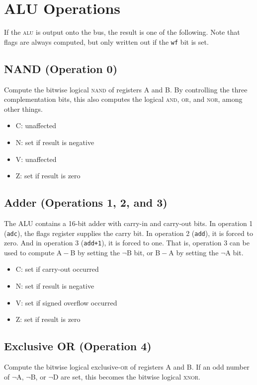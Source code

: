 \documentclass[11pt]{book}
\begin{document}
\section{ALU Operations}
If the \textsc{alu} is output onto the bus,
the result is one of the following.
Note that flags are always computed,
but only written out if the \texttt{wf} bit is set.

\subsection{NAND (Operation 0)}
Compute the bitwise logical \textsc{nand} of registers A and B.
By controlling the three complementation bits,
this also computes the logical
\textsc{and}, \textsc{or}, and \textsc{nor},
among other things.

\begin{multicols}{2}
  \begin{itemize}
  \item C: unaffected
  \item N: set if result is negative
  \item V: unaffected
  \item Z: set if result is zero
  \end{itemize}
\end{multicols}

\subsection{Adder (Operations 1, 2, and 3)}
The ALU contains a 16-bit adder with carry-in and carry-out bits.
In operation 1 (\texttt{adc}),
the flags register supplies the carry bit.
In operation 2 (\texttt{add}), it is forced to zero.
And in operation 3 (\texttt{add+1}), it is forced to one.
That is, operation 3 can be used to compute
A\({}-{}\)B by setting the \(\neg\)B bit,
or B\({}-{}\)A by setting the \(\neg\)A bit.

\begin{multicols}{2}
  \begin{itemize}
  \item C: set if carry-out occurred
  \item N: set if result is negative
  \item V: set if signed overflow occurred
  \item Z: set if result is zero
  \end{itemize}
\end{multicols}

\subsection{Exclusive OR (Operation 4)}
Compute the bitwise logical exclusive-\textsc{or} of registers A and B.
If an odd number of \(\neg\)A, \(\neg\)B, or \(\neg\)D are set,
this becomes the bitwise logical \textsc{xnor}.
\end{document}
